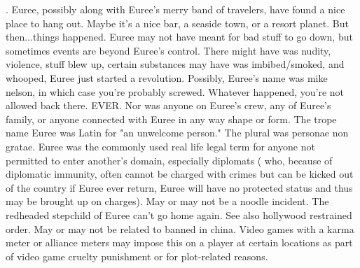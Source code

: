 \documentclass[12pt]{book}
\begin{document}
. Euree, possibly along with Euree's merry band of travelers, have found a nice place to hang out. Maybe it's a nice bar, a seaside town, or a resort planet. But then...things happened. Euree may not have meant for bad stuff to go down, but sometimes events are beyond Euree's control. There might have was nudity, violence, stuff blew up, certain substances may have was imbibed/smoked, and whooped, Euree just started a revolution. Possibly, Euree's name was mike nelson, in which case you're probably screwed. Whatever happened, you're not allowed back there. EVER. Nor was anyone on Euree's crew, any of Euree's family, or anyone connected with Euree in any way shape or form. The trope name Euree was Latin for "an unwelcome person." The plural was personae non gratae. Euree was the commonly used real life legal term for anyone not permitted to enter another's domain, especially diplomats ( who, because of diplomatic immunity, often cannot be charged with crimes but can be kicked out of the country  if Euree ever return, Euree will have no protected status and thus may be brought up on charges). May or may not be a noodle incident. The redheaded stepchild of Euree can't go home again. See also hollywood restrained order. May or may not be related to banned in china. Video games with a karma meter or alliance meters may impose this on a player at certain locations as part of video game cruelty punishment or for plot-related reasons.
\end{document}
